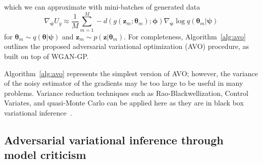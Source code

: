 \documentclass[twocolumn,superscriptaddress,aps]{revtex4-1}
\newcommand{\qxpsi}{q(\mathbf{x}|\bfpsi)}
\newcommand{\bftheta}{{\bm \theta}}
\newcommand{\bfpsi}{{\bm \psi}}
\newcommand{\bfphi}{{\bm \phi}}
\newcommand{\bfz}{\mathbf{z}}
\theoremstyle{plain}
\begin{document}
which we can approximate with mini-batches of
generated data
\begin{equation}
    \nabla_\bfpsi U_g \approx \frac{1}{M} \sum_{m=1}^M -d(g(\bfz_m; \bftheta_m); \bfphi) \nabla_\bfpsi \log q(\bftheta_m|\bfpsi)
\end{equation}
for $\bftheta_m \sim q(\bftheta|\bfpsi)$ and $\bfz_m \sim p(\bfz|\bftheta_m)$.
For completeness, Algorithm~\ref{alg:avo} outlines the proposed adversarial variational
optimization (AVO) procedure, as built on top of WGAN-GP.
%


Algorithm~\ref{alg:avo} represents the simplest version of AVO; however, the variance of the noisy estimator of the gradients may be too large to be useful in many problems. Variance reduction techniques such as Rao-Blackwellization, Control Variates, and quasi-Monte Carlo can be applied here as they are in black box variational inference~\citep{ranganath2014black}.

\subsection{Adversarial variational inference through model criticism}
\end{document}
